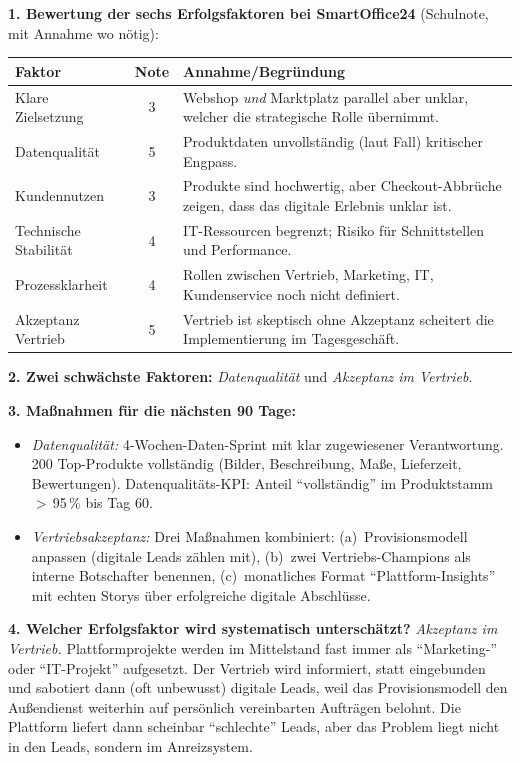 \documentclass[11pt,a4paper,oneside]{article}
\begin{document}
\begin{loesungbox}
\textbf{1. Bewertung der sechs Erfolgsfaktoren bei SmartOffice24} (Schulnote, mit Annahme wo nötig):

\smallskip
\begin{tabularx}{\linewidth}{@{}lcX@{}}
\toprule
\textbf{Faktor} & \textbf{Note} & \textbf{Annahme/Begründung} \\
\midrule
Klare Zielsetzung      & 3 & Webshop \emph{und} Marktplatz parallel \textendash{} aber unklar, welcher die strategische Rolle übernimmt. \\
\midrule
Datenqualität          & 5 & Produktdaten unvollständig (laut Fall) \textendash{} kritischer Engpass. \\
\midrule
Kundennutzen           & 3 & Produkte sind hochwertig, aber Checkout-Abbrüche zeigen, dass das digitale Erlebnis unklar ist. \\
\midrule
Technische Stabilität  & 4 & IT-Ressourcen begrenzt; Risiko für Schnittstellen und Performance. \\
\midrule
Prozessklarheit        & 4 & Rollen zwischen Vertrieb, Marketing, IT, Kundenservice noch nicht definiert. \\
\midrule
Akzeptanz Vertrieb     & 5 & Vertrieb ist skeptisch \textendash{} ohne Akzeptanz scheitert die Implementierung im Tagesgeschäft. \\
\bottomrule
\end{tabularx}

\smallskip
\textbf{2. Zwei schwächste Faktoren:} \emph{Datenqualität} und \emph{Akzeptanz im Vertrieb}.

\smallskip
\textbf{3. Maßnahmen für die nächsten 90 Tage:}
\begin{itemize}
  \item \emph{Datenqualität:} 4-Wochen-Daten-Sprint mit klar zugewiesener Verantwortung. 200 Top-Produkte vollständig (Bilder, Beschreibung, Maße, Lieferzeit, Bewertungen). Datenqualitäts-KPI: Anteil ``vollständig'' im Produktstamm $>$\,95\,\% bis Tag 60.
  \item \emph{Vertriebsakzeptanz:} Drei Maßnahmen kombiniert: (a)~Provisionsmodell anpassen (digitale Leads zählen mit), (b)~zwei Vertriebs-Champions als interne Botschafter benennen, (c)~monatliches Format ``Plattform-Insights'' mit echten Storys über erfolgreiche digitale Abschlüsse.
\end{itemize}

\textbf{4. Welcher Erfolgsfaktor wird systematisch unterschätzt?}
\emph{Akzeptanz im Vertrieb.} Plattformprojekte werden im Mittelstand fast immer als ``Marketing-'' oder ``IT-Projekt'' aufgesetzt. Der Vertrieb wird informiert, statt eingebunden \textendash{} und sabotiert dann (oft unbewusst) digitale Leads, weil das Provisionsmodell den Außendienst weiterhin auf persönlich vereinbarten Aufträgen belohnt. Die Plattform liefert dann scheinbar ``schlechte'' Leads, aber das Problem liegt nicht in den Leads, sondern im Anreizsystem.


\end{loesungbox}
\end{document}
